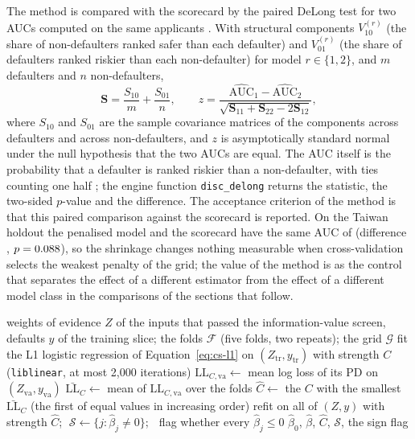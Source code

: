 The method is compared with the scorecard by the paired DeLong test for two AUCs computed on the same applicants
\citep{credit-scoring:delong1988}. With structural components $V^{(r)}_{10}$ (the share of non-defaulters ranked safer than each
defaulter) and $V^{(r)}_{01}$ (the share of defaulters ranked riskier than each non-defaulter) for model $r\in\{1,2\}$, and
$m$ defaulters and $n$ non-defaulters,
\begin{equation}
\mathbf S=\frac{S_{10}}{m}+\frac{S_{01}}{n},\qquad
z=\frac{\widehat{\mathrm{AUC}}_1-\widehat{\mathrm{AUC}}_2}{\sqrt{\mathbf S_{11}+\mathbf S_{22}-2\mathbf S_{12}}},
\label{eq:cs-delong}
\end{equation}
where $S_{10}$ and $S_{01}$ are the sample covariance matrices of the components across defaulters and across non-defaulters, and
$z$ is asymptotically standard normal under the null hypothesis that the two AUCs are equal. The AUC itself is the probability that
a defaulter is ranked riskier than a non-defaulter, with ties counting one half \citep{credit-scoring:hanley1982}; the engine
function \texttt{disc\_delong} returns the statistic, the two-sided $p$-value and the difference. The acceptance criterion of the
method is that this paired comparison against the scorecard is reported. On the Taiwan holdout the penalised model and the
scorecard have the same AUC of \csHoLlAuc{} (difference \csHoLlDlDiff{}, $p=0.088{}$), so the shrinkage changes nothing
measurable when cross-validation selects the weakest penalty of the grid; the value of the method is as the control that separates the effect of
a different estimator from the effect of a different model class in the comparisons of the sections that follow.

\begin{algorithm}[htbp]
\caption{Fit of the penalised logistic regression on weights of evidence, with the strength chosen by cross-validation}
\label{alg:cs-penalised}
\begin{algorithmic}[1]
\Require weights of evidence $Z$ of the inputs that passed the information-value screen, defaults $y$ of the training slice; the folds $\mathcal{F}$ (five folds, two repeats); the grid $\mathcal{G}$
    \State fit the L1 logistic regression of Equation~\eqref{eq:cs-l1} on $(Z_{\mathrm{tr}},y_{\mathrm{tr}})$ with strength $C$ (\texttt{liblinear}, at most 2,000 iterations)
    \State $\mathrm{LL}_{C,\mathrm{va}}\gets$ mean log loss of its PD on $(Z_{\mathrm{va}},y_{\mathrm{va}})$
  \EndFor
  \State $\bar{\mathrm{LL}}_C\gets$ mean of $\mathrm{LL}_{C,\mathrm{va}}$ over the folds
\EndFor
\State $\hat C\gets$ the $C$ with the smallest $\bar{\mathrm{LL}}_C$ (the first of equal values in increasing order)
\State refit on all of $(Z,y)$ with strength $\hat C$; $\;\mathcal{S}\gets\{j:\hat\beta_j\neq0\}$; $\;$ flag whether every $\hat\beta_j\le0$
\State \Return $\hat\beta_0$, $\hat\beta$, $\hat C$, $\mathcal{S}$, the sign flag
\end{algorithmic}
\end{algorithm}


